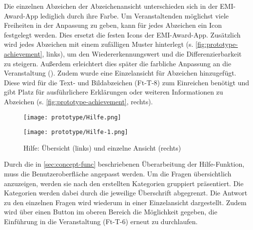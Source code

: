Die einzelnen Abzeichen der Abzeichenansicht unterschieden sich in der
EMI-Award-App lediglich durch ihre Farbe. Um Veranstaltenden möglichst viele
Freiheiten in der Anpassung zu geben, kann für jedes Abzeichen ein Icon
festgelegt werden. Dies ersetzt die festen Icons der EMI-Award-App. Zusätzlich
wird jedes Abzeichen mit einem zufälligen Muster hinterlegt (s.
\autoref{fig:prototype-achievement}, links), um den Wiedererkennungswert und die
Differenzierbarkeit zu steigern. Außerdem erleichtert dies später die farbliche
Anpassung an die Veranstaltung (). Zudem wurde eine Einzelansicht
für Abzeichen hinzugefügt. Diese wird für die Text- und Bildabzeichen (Ft-T-8)
zum Einreichen benötigt und gibt Platz für ausführlichere Erklärungen oder
weiteren Informationen zu Abzeichen (s. \autoref{fig:prototype-achievement},
rechts).

\begin{figure}[htpb]
    \begin{minipage}{.5\textwidth}
        \centering
        \texttt{[image: prototype/Hilfe.png]}
    \end{minipage}%
    \begin{minipage}{.5\textwidth}
        \centering
        \texttt{[image: prototype/Hilfe-1.png]}
    \end{minipage}
    \caption{Hilfe: Übersicht (links) und einzelne Ansicht (rechts)}
    \label{fig:prototype-help}
\end{figure}

Durch die in \autoref{sec:concept-func} beschriebenen Überarbeitung der
Hilfe-Funktion, muss die Benutzeroberfläche angepasst werden. Um die
Fragen übersichtlich anzuzeigen, werden sie nach den erstellten Kategorien
gruppiert präsentiert. Die Kategorien werden dabei durch die jeweilige
Überschrift abgegrenzt. Die Antwort zu den einzelnen Fragen wird wiederum in
einer Einzelansicht dargestellt. Zudem wird über einen Button im oberen Bereich
die Möglichkeit gegeben, die Einführung in die Veranstaltung (Ft-T-6) erneut zu durchlaufen.



%
%
%


